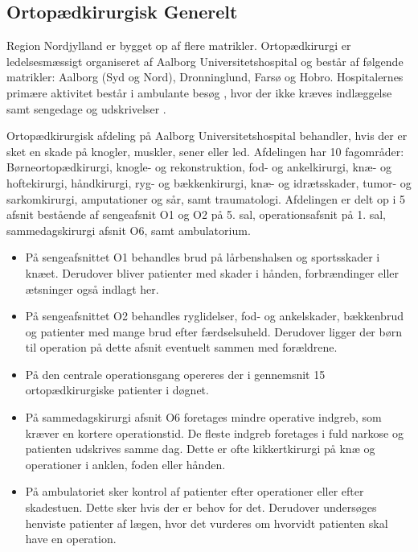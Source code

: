\subsection{Ortopædkirurgisk Generelt}
Region Nordjylland er bygget op af flere matrikler. Ortopædkirurgi er ledelsesmæssigt organiseret af Aalborg Universitetshospital og består af følgende matrikler: Aalborg (Syd og Nord), Dronninglund, Farsø og Hobro. Hospitalernes primære aktivitet består i ambulante besøg , hvor der ikke kræves indlæggelse samt sengedage  og udskrivelser  \cite{RegionNord2016}. 

Ortopædkirurgisk afdeling på Aalborg Universitetshospital behandler, hvis der er sket en skade  på knogler, muskler, sener eller led. Afdelingen har 10 fagområder: Børneortopædkirurgi, knogle- og rekonstruktion, fod- og ankelkirurgi, knæ- og hoftekirurgi, håndkirurgi, ryg- og bækkenkirurgi, knæ- og idrætsskader, tumor- og sarkomkirurgi, amputationer og sår, samt traumatologi.
Afdelingen er delt op i 5 afsnit bestående af sengeafsnit O1 og O2 på 5. sal, operationsafsnit på 1. sal, sammedagskirurgi afsnit O6, samt ambulatorium.  \cite{Aalborg2016}

\begin{itemize}
\item På sengeafsnittet O1 behandles brud på lårbenshalsen og sportsskader i knæet. Derudover bliver patienter med skader i hånden, forbrændinger eller ætsninger også indlagt her.
\item På sengeafsnittet O2 behandles ryglidelser, fod- og ankelskader, bækkenbrud og patienter med mange brud efter færdselsuheld. Derudover ligger der børn til operation på dette afsnit eventuelt sammen med forældrene. 
\item På den centrale operationsgang opereres der i gennemsnit 15 ortopædkirurgiske patienter i døgnet. 
\item På sammedagskirurgi afsnit O6 foretages mindre operative indgreb, som kræver en kortere operationstid. De fleste indgreb foretages i fuld narkose og patienten udskrives samme dag. Dette er ofte kikkertkirurgi på knæ og operationer i anklen, foden eller hånden. 
\item På ambulatoriet sker kontrol af patienter efter operationer eller efter skadestuen. Dette sker hvis der er behov for det. Derudover undersøges henviste patienter af lægen, hvor det vurderes om hvorvidt patienten skal have en operation. \cite{Aalborg2016}
\end{itemize}

